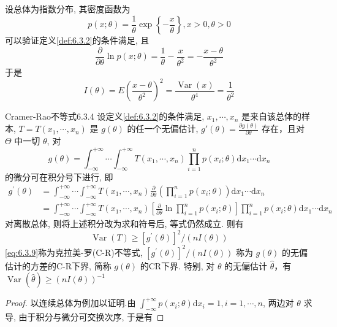 \begin{example}\label{exam:6.3.4}
设总体为指数分布, 其密度函数为
\[p(x ; \theta)=\frac{1}{\theta} \exp \left\{-\frac{x}{\theta}\right\}, x>0, \theta>0\]
可以验证定义\ref{def:6.3.2}的条件满足, 且
\[\frac{\partial}{\partial \theta} \ln p(x ; \theta)=\frac{1}{\theta}-\frac{x}{\theta^{2}}=-\frac{x-\theta}{\theta^{2}}\]
于是
\[I(\theta)=E\left(\frac{x-\theta}{\theta^{2}}\right)^{2}=\frac{\operatorname{Var}(x)}{\theta^{4}}=\frac{1}{\theta^{2}}\]
\end{example}

\begin{theorem}{Cramer-Rao不等式}{6.3.4}
设定义\ref{def:6.3.2}的条件满足, $x_{1}, \cdots, x_{n}$ 是来自该总体的样本, $T=T\left(x_{1}, \cdots, x_{n}\right)$ 是 $g(\theta)$ 的任一个无偏估计, $g'(\theta)=\frac{\partial g(\theta)}{\partial \theta}$ 存在，且对 $\Theta$ 中一切 $\theta$, 对
\[g(\theta)=\int_{-\infty}^{+\infty} \cdots \int_{-\infty}^{+\infty} T\left(x_{1}, \cdots, x_{n}\right) \prod_{i=1}^{n} p\left(x_{i} ; \theta\right) \mathrm{d} x_{1} \cdots \mathrm{d} x_{n}\]
的微分可在积分号下进行, 即
\begin{equation}\label{eq:6.3.8}
\begin{aligned} g^{\prime}(\theta) &=\int_{-\infty}^{+\infty} \cdots \int_{-\infty}^{+\infty} T\left(x_{1}, \cdots, x_{n}\right) \frac{\partial}{\partial \theta}\left(\prod_{i=1}^{n} p\left(x_{i} ; \theta\right)\right) \mathrm{d} x_{1} \cdots \mathrm{d} x_{n} \\ &=\int_{-\infty}^{+\infty} \cdots \int_{-\infty}^{+\infty} T\left(x_{1}, \cdots, x_{n}\right)\left[\frac{\partial}{\partial \theta} \ln \prod_{i=1}^{n} p\left(x_{i} ; \theta\right)\right] \prod_{i=1}^{n} p\left(x_{i} ; \theta\right) \mathrm{d} x_{1} \cdots \mathrm{d} x_{n}
\end{aligned}
\end{equation}
对离散总体, 则将上述积分改为求和符号后, 等式仍然成立. 则有
\begin{equation}\label{eq:6.3.9}
\operatorname{Var}(T) \geqslant\left[g^{\prime}(\theta)\right]^{2} /(n I(\theta))
\end{equation}
\eqref{eq:6.3.9}称为克拉美-罗(C-R)不等式, $\left[g^{\prime}(\theta)\right]^{2} /(n I(\theta))$ 称为 $g(\theta)$ 的无偏估计的方差的C-R下界, 简称 $g(\theta)$ 的CR下界. 特别, 对 $\theta$ 的无偏估计 $\hat{\theta}$，有 $\operatorname{Var}(\hat{\theta})\geqslant(n I(\theta))^{-1}$
\end{theorem}\begin{proof}
以连续总体为例加以证明.由 $\int_{-\infty}^{+\infty} p\left(x_{i} ; \theta\right) \mathrm{d} x_{i}=1, i=1, \cdots, n$, 两边对 $\theta$ 求导, 由于积分与微分可交换次序, 于是有

\end{proof}
